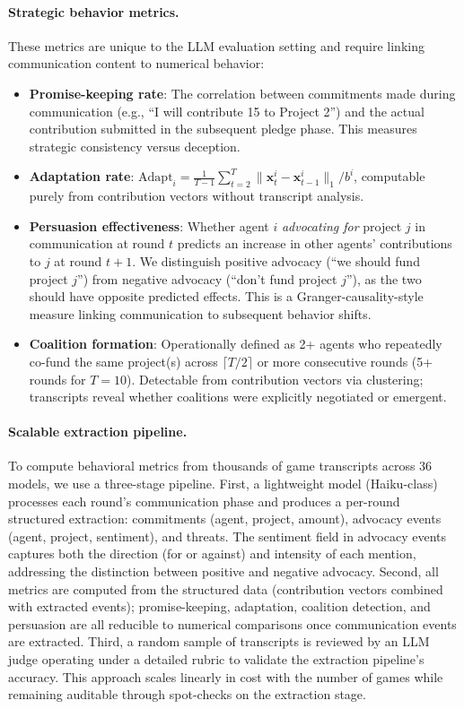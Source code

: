 \paragraph{Strategic behavior metrics.}
These metrics are unique to the LLM evaluation setting and require linking communication content to numerical behavior:
\begin{itemize}
    \item \textbf{Promise-keeping rate}: The correlation between commitments made during communication (e.g., ``I will contribute 15 to Project 2'') and the actual contribution submitted in the subsequent pledge phase. This measures strategic consistency versus deception.
    \item \textbf{Adaptation rate}: $\text{Adapt}_i = \frac{1}{T-1} \sum_{t=2}^{T} \|\bm{x}^i_t - \bm{x}^i_{t-1}\|_1 / b^i$, computable purely from contribution vectors without transcript analysis.
    \item \textbf{Persuasion effectiveness}: Whether agent $i$ \emph{advocating for} project $j$ in communication at round $t$ predicts an increase in other agents' contributions to $j$ at round $t+1$. We distinguish positive advocacy (``we should fund project $j$'') from negative advocacy (``don't fund project $j$''), as the two should have opposite predicted effects. This is a Granger-causality-style measure linking communication to subsequent behavior shifts.
    \item \textbf{Coalition formation}: Operationally defined as 2+ agents who repeatedly co-fund the same project(s) across $\lceil T/2 \rceil$ or more consecutive rounds (5+ rounds for $T = 10$). Detectable from contribution vectors via clustering; transcripts reveal whether coalitions were explicitly negotiated or emergent.
\end{itemize}

\paragraph{Scalable extraction pipeline.}
To compute behavioral metrics from thousands of game transcripts across 36 models, we use a three-stage pipeline.
First, a lightweight model (Haiku-class) processes each round's communication phase and produces a per-round structured extraction: commitments (agent, project, amount), advocacy events (agent, project, sentiment), and threats.
The sentiment field in advocacy events captures both the direction (for or against) and intensity of each mention, addressing the distinction between positive and negative advocacy.
Second, all metrics are computed from the structured data (contribution vectors combined with extracted events); promise-keeping, adaptation, coalition detection, and persuasion are all reducible to numerical comparisons once communication events are extracted.
Third, a random sample of transcripts is reviewed by an LLM judge operating under a detailed rubric to validate the extraction pipeline's accuracy.
This approach scales linearly in cost with the number of games while remaining auditable through spot-checks on the extraction stage.

